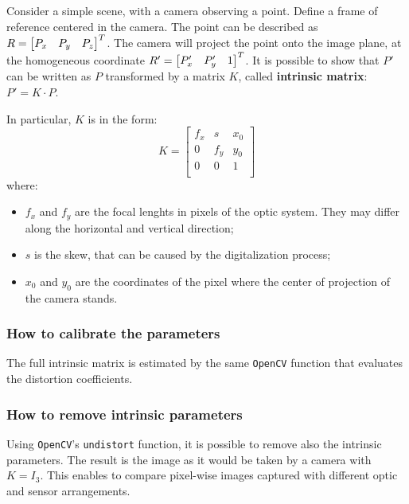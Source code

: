 Consider a simple scene, with a camera observing a point.
Define a frame of reference centered in the camera.
The point can be described as $R=\begin{bmatrix} P_x & P_y & P_z \end{bmatrix}^T$.
The camera will project the point onto the image plane, at the homogeneous coordinate $R'=\begin{bmatrix} P_x' & P_y' & 1 \end{bmatrix}^T$.
It is possible to show that $P'$ can be written as $P$ transformed by a matrix $K$, called \textbf{intrinsic matrix}: $P' = K{\cdot}P$.

In particular, $K$ is in the form:
\begin{equation}
	K = \begin{bmatrix}
		f_x & s   & x_0 \\
		0   & f_y & y_0 \\
		0   & 0   & 1   \\
	\end{bmatrix}
\end{equation}
where:
\begin{itemize}
	\itemsep 0em
	\item $f_x$ and $f_y$ are the focal lenghts in pixels of the optic system. They may differ along the horizontal and vertical direction;
	\item $s$ is the skew, that can be caused by the digitalization process;
	\item $x_0$ and $y_0$ are the coordinates of the pixel where the center of projection of the camera stands.
\end{itemize}

\subsubsection{How to calibrate the parameters}

The full intrinsic matrix is estimated by the same \texttt{OpenCV} function that evaluates the distortion coefficients.

\subsubsection{How to remove intrinsic parameters}
Using \texttt{OpenCV}'s \texttt{undistort} function, it is possible to remove also the intrinsic parameters.
The result is the image as it would be taken by a camera with $K{=}I_3$.
This enables to compare pixel-wise images captured with different optic and sensor arrangements.

